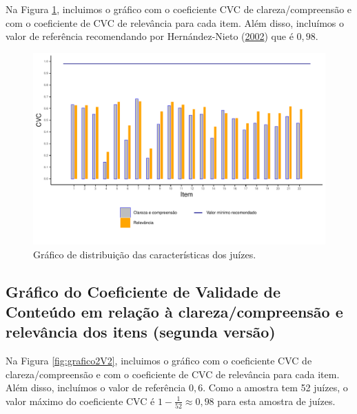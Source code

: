 \documentclass[
]{article}
\begin{document}
Na Figura \ref{fig:grafico2V1}, incluimos o gráfico com o coeficiente CVC de clareza/compreensão e com o coeficiente de CVC de relevância para cada item. Além disso, incluímos o valor de referência recomendando por Hernández-Nieto (\protect\hyperlink{ref-hernandez2002contributions}{2002}) que é \(0,98\).

\begin{figure}[htbp]

{\centering \includegraphics[width=0.9\linewidth]{../figures/grafico2_0_8} 

}

\caption{Gráfico de distribuição das características dos juízes.}\label{fig:grafico2V1}
\end{figure}

\newpage

\hypertarget{gruxe1fico-do-coeficiente-de-validade-de-conteuxfado-em-relauxe7uxe3o-uxe0-clarezacompreensuxe3o-e-relevuxe2ncia-dos-itens-segunda-versuxe3o}{%
\subsection{Gráfico do Coeficiente de Validade de Conteúdo em relação à clareza/compreensão e relevância dos itens (segunda versão)}\label{gruxe1fico-do-coeficiente-de-validade-de-conteuxfado-em-relauxe7uxe3o-uxe0-clarezacompreensuxe3o-e-relevuxe2ncia-dos-itens-segunda-versuxe3o}}

Na Figura \ref{fig:grafico2V2}, incluimos o gráfico com o coeficiente CVC de clareza/compreensão e com o coeficiente de CVC de relevância para cada item. Além disso, incluímos o valor de referência \(0,6\). Como a amostra tem 52 juízes, o valor máximo do coeficiente CVC é \(1-\frac{1}{52}\approx 0,98\) para esta amostra de juízes.
\end{document}
